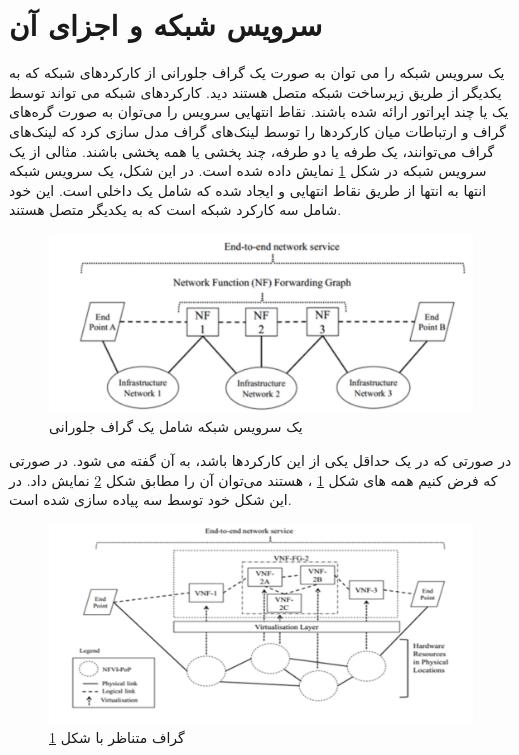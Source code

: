 \section{سرویس شبکه و اجزای آن}
یک سرویس شبکه را می توان به صورت یک گراف جلورانی از کارکردهای شبکه
که به یکدیگر از طریق زیرساخت شبکه متصل هستند دید.
کارکردهای شبکه می تواند توسط یک یا چند اپراتور ارائه شده باشند.
نقاط انتهایی سرویس را می‌توان به صورت گره‌های گراف و
ارتباطات میان کارکردها را توسط لینک‌های گراف مدل سازی کرد
که لینک‌های گراف می‌توانند، یک طرفه یا دو طرفه، چند پخشی یا همه پخشی باشند.
مثالی از یک سرویس شبکه در شکل
\ref{fig.18}
نمایش داده شده است.
در این شکل، یک سرویس شبکه انتها به انتها از طریق نقاط انتهایی  و  ایجاد شده که شامل یک  داخلی است.
این  خود شامل سه کارکرد شبکه است که به یکدیگر متصل هستند.


\begin{figure}[h!]
\center\includegraphics[scale=.5]{images/network-service}
\caption{یک سرویس شبکه شامل یک گراف جلورانی}
\label{fig.18}
\end{figure}

در صورتی که در یک   حداقل یکی از این کارکردها  باشد، به آن  گفته می شود.
در صورتی که فرض کنیم همه  های شکل
\ref{fig.18}
،  هستند می‌توان آن را مطابق شکل
\ref{fig.19}
نمایش داد.
در این شکل  خود توسط سه  پیاده سازی شده است.

\begin{figure}[h!]
\center\includegraphics[scale=.5]{images/vnf-fg}
\caption{گراف  متناظر با شکل \ref{fig.18}}
\label{fig.19}
\end{figure}


